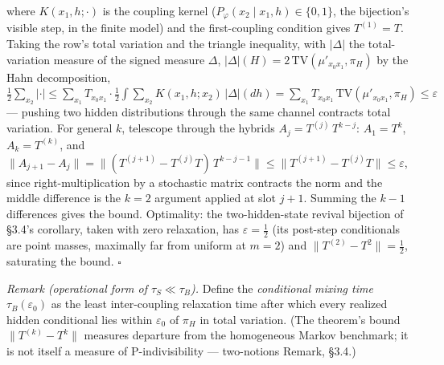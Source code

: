 \documentclass[
]{article}
\begin{document}
where \(K(x_1, h; \cdot)\) is the coupling kernel
(\(P_\varphi(x_2 \mid x_1, h) \in \{0, 1\}\), the bijection's visible
step, in the finite model) and the first-coupling condition gives
\(T^{(1)} = T\). Taking the row's total variation and the triangle
inequality, with \(|\Delta|\) the total-variation measure of the signed
measure \(\Delta\),
\(|\Delta|(H) = 2\,\mathrm{TV}(\mu'_{x_0 x_1}, \pi_H)\) by the Hahn
decomposition,
\(\tfrac{1}{2}\sum_{x_2} |\cdot| \leq \sum_{x_1} T_{x_0 x_1} \cdot \tfrac{1}{2} \int \sum_{x_2} K(x_1, h; x_2)\,|\Delta|(dh) = \sum_{x_1} T_{x_0 x_1}\, \mathrm{TV}(\mu'_{x_0 x_1}, \pi_H) \leq \varepsilon\)
--- pushing two hidden distributions through the same channel contracts
total variation. For general \(k\), telescope through the hybrids
\(A_j = T^{(j)}\, T^{k-j}\): \(A_1 = T^k\), \(A_k = T^{(k)}\), and
\(\|A_{j+1} - A_j\| = \|(T^{(j+1)} - T^{(j)} T)\, T^{k-j-1}\| \leq \|T^{(j+1)} - T^{(j)} T\| \leq \varepsilon\),
since right-multiplication by a stochastic matrix contracts the norm and
the middle difference is the \(k = 2\) argument applied at slot \(j+1\).
Summing the \(k - 1\) differences gives the bound. Optimality: the
two-hidden-state revival bijection of §3.4's corollary, taken with zero
relaxation, has \(\varepsilon = \tfrac{1}{2}\) (its post-step
conditionals are point masses, maximally far from uniform at \(m = 2\))
and \(\|T^{(2)} - T^2\| = \tfrac{1}{2}\), saturating the bound.
\(\square\)

\emph{Remark (operational form of \(\tau_S \ll \tau_B\)).} Define the
\emph{conditional mixing time} \(\tau_B(\varepsilon_0)\) as the least
inter-coupling relaxation time after which every realized hidden
conditional lies within \(\varepsilon_0\) of \(\pi_H\) in total
variation. (The theorem's bound \(\|T^{(k)} - T^k\|\) measures departure
from the homogeneous Markov benchmark; it is not itself a measure of
P-indivisibility --- two-notions Remark, §3.4.)
\end{document}
